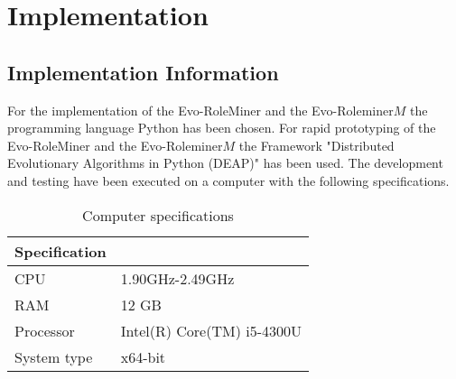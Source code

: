 \chapter{Implementation}
\section{Implementation Information}
\label{sec:A_spec}
	For the implementation of the Evo-RoleMiner and the Evo-Roleminer$M$ the programming language Python has been chosen. For rapid prototyping of the Evo-RoleMiner and the Evo-Roleminer$M$ the Framework "Distributed Evolutionary Algorithms in Python (DEAP)"\cite{DeRainville:2012} has been used. The development and testing have been executed on a computer with the following specifications.
	
	\begin{table}[H]
		\centering
		\caption{Computer specifications}
		\label{tab:specifications}
		\begin{tabular}{|l|l|}
			\hline
			\rowcolor[HTML]{EFEFEF} 
			Specification &                            \\ \hline
			CPU           & 1.90GHz-2.49GHz            \\ \hline
			RAM           & 12 GB                      \\ \hline
			Processor     & Intel(R) Core(TM) i5-4300U \\ \hline
			System type   & x64-bit                    \\ \hline
		\end{tabular}
	\end{table}
	
